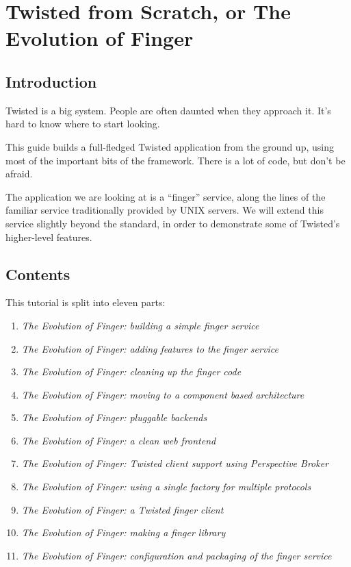 \section{Twisted from Scratch, or The Evolution of Finger\label{doc/howto/tutorial/index.xhtml}}


\subsection{Introduction}


 Twisted is a big system. People are often daunted when they approach it. It's hard to know where to start looking. 

 This guide builds a full-fledged Twisted application from the ground up, using most of the important bits of the framework. There is a lot of code, but don't be afraid. 

 The application we are looking at is a ``finger'' service, along the  lines of the familiar service traditionally provided by UNIX servers.  We will extend this service slightly beyond the standard, in order to  demonstrate some of Twisted's higher-level features. 

\subsection{Contents}


 This tutorial is split into eleven parts: \begin{enumerate}
\item \textit{The Evolution of Finger: building a simple finger service}
\item \textit{The Evolution of Finger: adding features to the finger service}
\item \textit{The Evolution of Finger: cleaning up the finger code}
\item \textit{The Evolution of Finger: moving to a component based architecture}
\item \textit{The Evolution of Finger: pluggable backends}
\item \textit{The Evolution of Finger: a clean web frontend}
\item \textit{The Evolution of Finger: Twisted client support using Perspective Broker}
\item \textit{The Evolution of Finger: using a single factory for multiple protocols}
\item \textit{The Evolution of Finger: a Twisted finger client}
\item \textit{The Evolution of Finger: making a finger library}
\item \textit{The Evolution of Finger: configuration and packaging of the finger service}
\end{enumerate}
